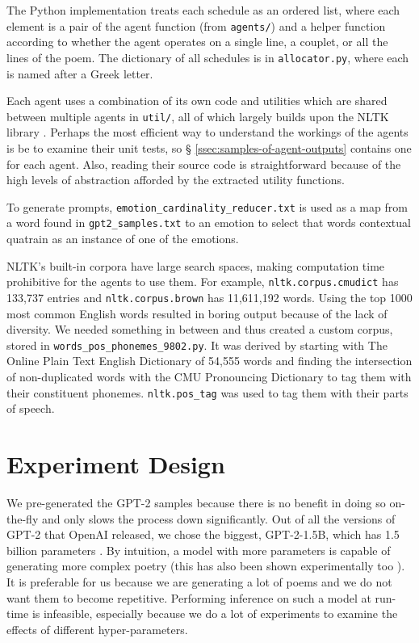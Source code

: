 \documentclass[a4paper,10pt]{article}
\begin{document}
The Python implementation treats each schedule as an ordered list, where each element is a pair of the agent function (from \texttt{agents/}) and a helper function according to whether the agent operates on a single line, a couplet, or all the lines of the poem. The dictionary of all schedules is in \texttt{allocator.py}, where each is named after a Greek letter.

Each agent uses a combination of its own code and utilities which are shared between multiple agents in \texttt{util/}, all of which largely builds upon the NLTK library \cite{xue_2011}. Perhaps the most efficient way to understand the workings of the agents is be to examine their unit tests, so § \ref{ssec:samples-of-agent-outputs} contains one for each agent. Also, reading their source code is straightforward because of the high levels of abstraction afforded by the extracted utility functions.

To generate prompts, \texttt{emotion\_cardinality\_reducer.txt} \cite{emotion-cardinality-reducer-github} is used as a map from a word found in \texttt{gpt2\_samples.txt} to an emotion to select that words contextual quatrain as an instance of one of the emotions.

NLTK's built-in corpora have large search spaces, making computation time prohibitive for the agents to use them. For example, \texttt{nltk.corpus.cmudict} has 133,737 entries and \texttt{nltk.corpus.brown} \cite{francis1979brown} has 11,611,192 words. Using the top 1000 most common English words resulted in boring output because of the lack of diversity. We needed something in between and thus created a custom corpus, stored in \texttt{words\_pos\_phonemes\_9802.py}. It was derived by starting with The Online Plain Text English Dictionary \cite{OPTED} of 54,555 words and finding the intersection of non-duplicated words with the CMU Pronouncing Dictionary \cite{CMUpd} to tag them with their constituent phonemes. \texttt{nltk.pos\_tag} was used to tag them with their parts of speech.

\section{Experiment Design}

We pre-generated the GPT-2 samples because there is no benefit in doing so on-the-fly and only slows the process down significantly. Out of all the versions of GPT-2 that OpenAI released, we chose the biggest, GPT-2-1.5B, which has 1.5 billion parameters \cite{solaiman_release_2019}. By intuition, a model with more parameters is capable of generating more complex poetry (this has also been shown experimentally too \cite{branwen_gpt-2_2019}). It is preferable for us because we are generating a lot of poems and we do not want them to become repetitive. Performing inference on such a model at run-time is infeasible, especially because we do a lot of experiments to examine the effects of different hyper-parameters.
\end{document}
